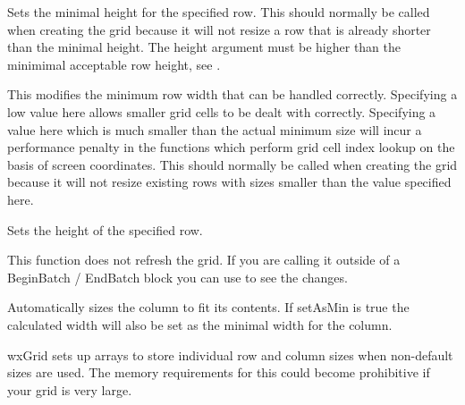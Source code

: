 \label{wxgridsetrowminimalheight}


Sets the minimal height for the specified row. This should normally be called when creating the grid
because it will not resize a row that is already shorter than the minimal height.
The height argument must be higher than the minimimal acceptable row height, see
.



\label{wxgridsetrowminimalacceptableheight}


This modifies the minimum row width that can be handled correctly. Specifying a low value here
allows smaller grid cells to be dealt with correctly. Specifying a value here which is much smaller
than the actual minimum size will incur a performance penalty in the functions which perform
grid cell index lookup on the basis of screen coordinates.
This should normally be called when creating the grid because it will not resize existing rows
with sizes smaller than the value specified here.



\label{wxgridsetrowsize}


Sets the height of the specified row.

This function does not refresh the grid. If you are calling it outside of a BeginBatch / EndBatch
block you can use  to see the changes.

Automatically sizes the column to fit its contents. If setAsMin is true the calculated width will
also be set as the minimal width for the column.


wxGrid sets up arrays to store individual row and column sizes when non-default sizes are used.
The memory requirements for this could become prohibitive if your grid is very large.



\label{wxgridsetscrolllinex}

